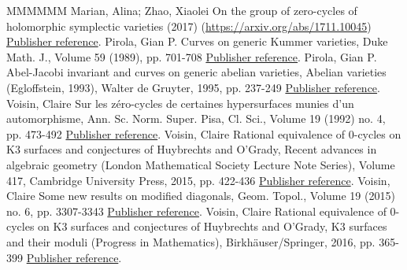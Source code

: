 \documentclass[11pt]{article}
\theoremstyle{definition}
\numberwithin{equation}{section}
\numberwithin{figure}{section}
\numberwithin{table}{section}
\begin{document}
\begin{thebibliography}{MMMMMM}
 Marian, Alina; Zhao, Xiaolei On the group of zero-cycles of holomorphic symplectic varieties (2017) (\url{https://arxiv.org/abs/1711.10045}) \href{https://ahl.centre-mersenne.org/item/AHL_2018__1__313_0/#marian}{Publisher reference}.
 Pirola, Gian P. Curves on generic Kummer varieties, Duke Math. J., Volume 59 (1989), pp. 701-708 \href{https://ahl.centre-mersenne.org/item/AHL_2018__1__313_0/#pirola}{Publisher reference}.
 Pirola, Gian P. Abel-Jacobi invariant and curves on generic abelian varieties, Abelian varieties (Egloffstein, 1993), Walter de Gruyter, 1995, pp. 237-249 \href{https://ahl.centre-mersenne.org/item/AHL_2018__1__313_0/#pirola2}{Publisher reference}.
 Voisin, Claire Sur les zéro-cycles de certaines hypersurfaces munies d’un automorphisme, Ann. Sc. Norm. Super. Pisa, Cl. Sci., Volume 19 (1992) no. 4, pp. 473-492 \href{https://ahl.centre-mersenne.org/item/AHL_2018__1__313_0/#voisingodeaux}{Publisher reference}.
 Voisin, Claire Rational equivalence of 0-cycles on K3 surfaces and conjectures of Huybrechts and O’Grady, Recent advances in algebraic geometry (London Mathematical Society Lecture Note Series), Volume 417, Cambridge University Press, 2015, pp. 422-436 \href{https://ahl.centre-mersenne.org/item/AHL_2018__1__313_0/#voisink3}{Publisher reference}.
 Voisin, Claire Some new results on modified diagonals, Geom. Topol., Volume 19 (2015) no. 6, pp. 3307-3343 \href{https://ahl.centre-mersenne.org/item/AHL_2018__1__313_0/#voisindiag}{Publisher reference}.
 Voisin, Claire Rational equivalence of 0-cycles on K3 surfaces and conjectures of Huybrechts and O’Grady, K3 surfaces and their moduli (Progress in Mathematics), Birkhäuser/Springer, 2016, pp. 365-399 \href{https://ahl.centre-mersenne.org/item/AHL_2018__1__313_0/#voisinisot}{Publisher reference}.
\end{thebibliography}
\end{document}

